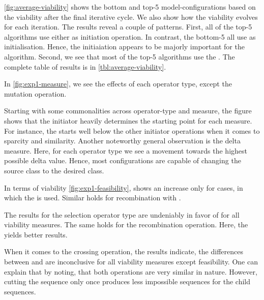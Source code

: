 \documentclass[./../../paper.tex]{subfiles}
\begin{document}
\autoref{fig:average-viability} shows the bottom and top-5 model-configurations based on the viability after the final iterative cycle. We also show how the viability evolves for each iteration. The results reveal a couple of patterns. 
First, all of the top-5 algorithms use either  as initiation operation. In contrast, the bottom-5 all use  as initialisation. Hence, the initiaiation appears to be majorly important for the algorithm.
Second, we see that most of the top-5 algorithms use the . The complete table of results is in \autoref{tbl:average-viability}.





In \autoref{fig:exp1-measure}, we see the effects of each operator type, except the mutation operation. 

Starting with some commonalities across operator-type and measure, the figure shows that the initiator heavily determines the starting point for each measure. For instance, the  starts well below the other initiator operations when it comes to sparcity and similarity. 
Another noteworthy general observation is the delta measure. Here, for each operator type we see a movement towards the highest possible delta value. Hence, most configurations are capable of changing the source class to the desired class. 

In terms of viability \autoref{fig:exp1-feasibility}, shows an increase only for cases, in which the  is used. Similar holds for recombination with .

The results for the selection operator type are undeniably in favor of  for all viability measures. The same holds for the recombination operation. Here, the  yields better results.

When it comes to the crossing operation, the results indicate, the differences between  and  are inconclusive for all viability measures except feasibility. One can explain that by noting, that both operations are very similar in nature. However, cutting the sequence only once produces less impossible sequences for the child sequences.
\end{document}
